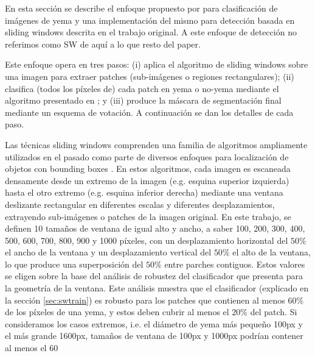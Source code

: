 \documentclass[a4paper,authoryear,review]{elsarticle}
\begin{document}
En esta sección se describe el enfoque propuesto por \citet{perez2017image} para clasificación de imágenes de yema y una implementación del mismo para detección basada en sliding windows descrita en el trabajo original. A este enfoque de detección no referimos como SW de aquí a lo que resto del paper.

Este enfoque opera en tres pasos: (i) aplica el algoritmo de sliding windows sobre una imagen para extraer patches (sub-imágenes o regiones rectangulares); (ii) clasifica (todos los píxeles de) cada patch en yema o no-yema mediante el algoritmo presentado en \citet{perez2017image}; y (iii) produce la máscara de segmentación final mediante un esquema de votación. A continuación se dan los detalles de cada paso.

Las técnicas sliding windows comprenden una familia de algoritmos ampliamente utilizados en el pasado como parte de diversos enfoques para localización de objetos con bounding boxes \citep{divvala2009empirical, wang2009hog, chum2007exemplar, ferrari2007groups, dalal2005histograms, rowley1996human}. En estos algoritmos, cada imagen es escaneada densamente desde un extremo de la imagen (e.g. esquina superior izquierda) hasta el otro extremo (e.g. esquina inferior derecha) mediante una ventana deslizante rectangular en diferentes escalas y diferentes desplazamientos, extrayendo sub-imágenes o patches de la imagen original. En este trabajo, se definen 10 tamaños de ventana de igual alto y ancho, a saber 100, 200, 300, 400, 500, 600, 700, 800, 900 y 1000 píxeles, con un desplazamiento horizontal del $50\%$ el ancho de la ventana y un desplazamiento vertical del $50\%$ el alto de la ventana, lo que produce una superposición del $50\%$ entre parches contiguos. Estos valores se eligen sobre la base del análisis de robustez del clasificador que presenta \citet{perez2017image} para la geometría de la ventana. Este análisis muestra que el clasificador (explicado en la sección \ref{sec:swtrain}) es robusto para los patches que contienen al menos $60\%$ de los píxeles de una yema, y estos deben cubrir al menos el $20\%$ del patch. Si consideramos los casos extremos, i.e. el diámetro de yema más pequeño 100px y el más grande 1600px, tamaños de ventana de 100px y 1000px podrían contener al menos el 60%
\end{document}
